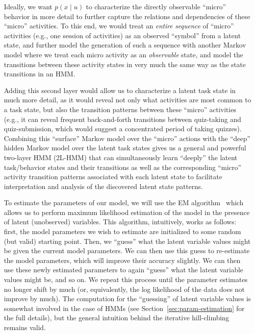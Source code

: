 Ideally, we want $p(x \mid u)$ to characterize the directly observable
``micro'' behavior in more detail to further capture the relations and
dependencies of these ``micro'' activities. To this end, we would treat an
\emph{entire sequence} of ``micro'' activities (e.g., one session of
activities) as an observed ``symbol'' from a latent state, and further
model the generation of such a sequence with another Markov model where we
treat each micro activity as an \emph{observable} state, and model the
transitions between these activity states in very much the same way as the
state transitions in an HMM.

Adding this second layer would allow us to characterize a latent task
state in much more detail, as it would reveal not only what activities are
most common to a task state, but also the transition patterns between these
``micro'' activities (e.g., it can reveal frequent back-and-forth
transitions between quiz-taking and quiz-submission, which would suggest a
concentrated period of taking quizzes). Combining this ``surface'' Markov
model over the ``micro'' actions with the ``deep'' hidden Markov model over
the latent task states gives us a general and powerful two-layer HMM
(2L-HMM) that can simultaneously learn ``deeply'' the latent task/behavior
states and their transitions as well as the corresponding ``micro''
activity transition patterns associated with each latent state to
facilitate interpretation and analysis of the discovered latent state
patterns.

To estimate the parameters of our model, we will use the EM
algorithm~\citep{Dempster:1977:JRSS} which allows us to perform maximum
likelihood estimation of the model in the presence of latent (unobserved)
variables. This algorithm, intuitively, works as follows: first, the model
parameters we wish to estimate are initialized to some random (but valid)
starting point. Then, we ``guess'' what the latent variable values might
be given the current model parameters. We can then use this guess to
re-estimate the model parameters, which will improve their accuracy
slightly. We can then use these newly estimated parameters to again
``guess'' what the latent variable values might be, and so on. We repeat
this process until the parameter estimates no longer shift by much (or,
equivalently, the log likelihood of the data does not improve by much). The
computation for the ``guessing'' of latent variable values is somewhat
involved in the case of HMMs (see Section~\ref{sec:param-estimation} for
the full details), but the general intuition behind the iterative
hill-climbing remains valid.

